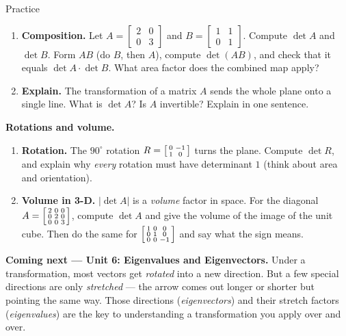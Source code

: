 \documentclass[10pt]{article}
\begin{document}
\begin{notesbox}{Practice}
\begin{enumerate}[leftmargin=1.9em, itemsep=11pt]
\begin{enumerate}[label=(\alph*), leftmargin=1.8em, itemsep=5pt]
    \end{enumerate}
    \vspace{0.3cm}
  \item \textbf{Composition.} Let $A=\begin{bmatrix} 2 & 0 \\ 0 & 3 \end{bmatrix}$ and
        $B=\begin{bmatrix} 1 & 1 \\ 0 & 1 \end{bmatrix}$. Compute $\det A$ and $\det B$. Form $AB$ (do $B$,
        then $A$), compute $\det(AB)$, and check that it equals $\det A\cdot\det B$. What area factor does
        the combined map apply? 
  \item \textbf{Explain.} The transformation of a matrix $A$ sends the whole plane onto a single line.
        What is $\det A$? Is $A$ invertible? Explain in one sentence. 
\end{enumerate}
\end{notesbox}

\begin{extensionbox}
\textbf{Rotations and volume.}
\begin{enumerate}[label=(\alph*), leftmargin=1.8em, itemsep=5pt]
  \item \textbf{Rotation.} The $90^\circ$ rotation $R=\begin{bsmallmatrix} 0 & -1 \\ 1 & 0 \end{bsmallmatrix}$
        turns the plane. Compute $\det R$, and explain why \emph{every} rotation must have determinant $1$
        (think about area and orientation).
  \item \textbf{Volume in 3-D.} $|\det A|$ is a \emph{volume} factor in space. For the diagonal
        $A=\begin{bsmallmatrix} 2 & 0 & 0 \\ 0 & 2 & 0 \\ 0 & 0 & 3 \end{bsmallmatrix}$, compute $\det A$
        and give the volume of the image of the unit cube. Then do the same for
        $\begin{bsmallmatrix} 1 & 0 & 0 \\ 0 & 1 & 0 \\ 0 & 0 & -1 \end{bsmallmatrix}$ and say what the sign means.
\end{enumerate}
\end{extensionbox}

\begin{spiralbox}
\textbf{Coming next --- Unit 6: Eigenvalues and Eigenvectors.} Under a transformation, most vectors get
\emph{rotated} into a new direction. But a few special directions are only \emph{stretched} --- the arrow
comes out longer or shorter but pointing the same way. Those directions (\emph{eigenvectors}) and their
stretch factors (\emph{eigenvalues}) are the key to understanding a transformation you apply over and over.
\end{spiralbox}
\end{document}
